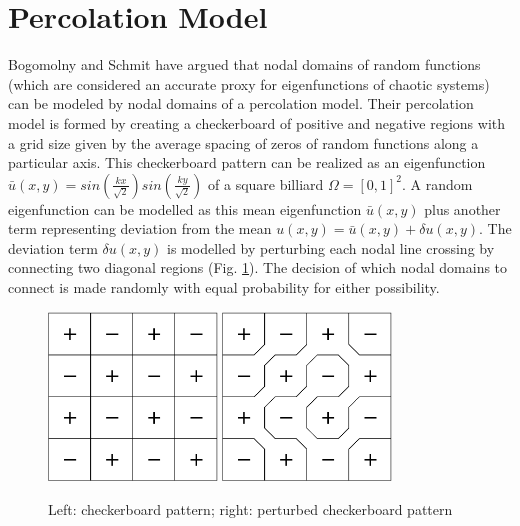 \documentclass{report}
\begin{document}
\section{Percolation Model}
Bogomolny and Schmit \cite{bogomolny} have argued that nodal domains of random functions (which are considered an accurate proxy for eigenfunctions of chaotic systems) can be modeled by nodal domains of a percolation model. Their percolation model is formed by creating a checkerboard of positive and negative regions with a grid size given by the average spacing of zeros of random functions along a particular axis. This checkerboard pattern can be realized as an eigenfunction $\bar{u}(x,y) = sin(\frac{kx}{\sqrt{2}})sin(\frac{ky}{\sqrt{2}})$ of a square billiard $\Omega = [0,1]^{2}$. A random eigenfunction can be modelled as this mean eigenfunction $\bar{u}(x,y)$ plus another term representing deviation from the mean $u(x,y) = \bar u(x,y) + \delta u(x,y)$. The deviation term $\delta u(x,y)$ is modelled by perturbing each nodal line crossing by connecting two diagonal regions (Fig. \ref{fig:percolation}). The decision of which nodal domains to connect is made randomly with equal probability for either possibility.

\begin{figure}
  \begin{center}
    \includegraphics[width=0.4\textwidth]{figs/percolation/checkerboard.eps}
    \hspace{1 cm}
    \includegraphics[width=0.4\textwidth]{figs/percolation/perturbed.eps}
    \caption{Left: checkerboard pattern; right: perturbed checkerboard pattern}
    \label{fig:percolation}
  \end{center}
\end{figure}
\end{document}
